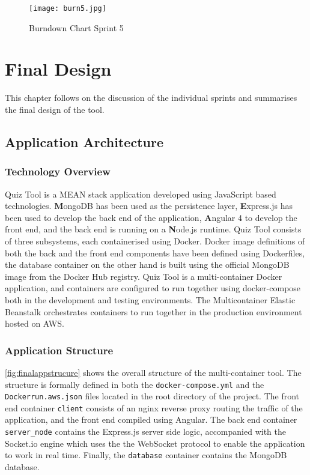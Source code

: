 \begin{figure}[h!]
    \centering
    \texttt{[image: burn5.jpg]}
    \caption{Burndown Chart Sprint 5}
    \label{fig:burn5}
\end{figure}

\chapter{Final Design}
This chapter follows on the discussion of the individual sprints and summarises
the final design of the tool.

\section{Application Architecture}
\subsection{Technology Overview}
Quiz Tool is a MEAN stack application developed using JavaScript based technologies. \textbf{M}ongoDB has been used
as the persistence layer, \textbf{E}xpress.js has been used to develop the back end of the
application, \textbf{A}ngular 4 to develop the front end, and the back end is running on
a \textbf{N}ode.js runtime. Quiz Tool consists of three subsystems, each containerised
using Docker. Docker image definitions of both the back and the front end components
have been defined using Dockerfiles, the database container on the other hand is
built using the official MongoDB image from the Docker Hub registry. Quiz Tool is
a multi-container Docker application, and containers are configured to run together
using docker-compose both in the development and testing environments. The Multicontainer
Elastic Beanstalk orchestrates containers to run together in the production environment
hosted on AWS.

\newpage
\subsection{Application Structure}
\autoref{fig:finalappstrucure} shows the overall structure of the multi-container
tool. The structure is formally defined in both the \texttt{docker-compose.yml} and
the \texttt{Dockerrun.aws.json} files located in the root directory of the project.
The front end container \texttt{client} consists of an nginx reverse proxy routing
the traffic of the application, and the front end compiled using Angular. The
back end container \texttt{server\_node} contains the Express.js server side logic,
accompanied with the Socket.io engine which uses the the WebSocket protocol to enable
the application to work in real time. Finally, the \texttt{database} container contains
the MongoDB database.

